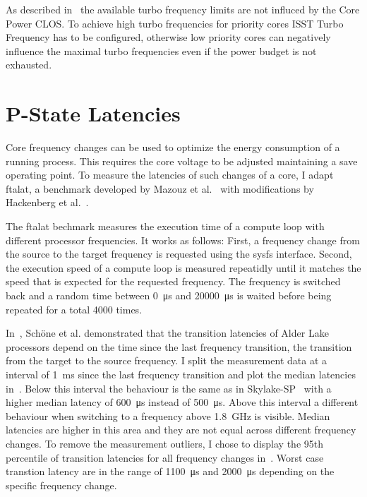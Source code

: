 As described in~ the available turbo frequency limits are not influced by the Core Power CLOS.
To achieve high turbo frequencies for priority cores ISST Turbo Frequency has to be configured, otherwise low priority cores can negatively influence the maximal turbo frequencies even if the power budget is not exhausted.

\section{P-State Latencies}
\label{sec:pstate_latencies}

Core frequency changes can be used to optimize the energy consumption of a running process.
This requires the core voltage to be adjusted maintaining a save operating point.
To measure the latencies of such changes of a core, I adapt ftalat, a benchmark developed by Mazouz et al.~\cite{Mazouz_2014_ftalat} with modifications by Hackenberg et al.~\cite{Hackenberg_2015_Haswell}.

The ftalat bechmark measures the execution time of a compute loop with different processor frequencies.
It works as follows:
First, a frequency change from the source to the target frequency is requested using the sysfs interface.
Second, the execution speed of a compute loop is measured repeatidly until it matches the speed that is expected for the requested frequency.
The frequency is switched back and a random time between \SI{0}{\us} and \SI{20000}{\us} is waited before being repeated for a total \SI{4000}{} times.

In~\cite{Schoene_2024_Alder_Lake}, Schöne et al. demonstrated that the transition latencies of Alder Lake processors depend on the time since the last frequency transition, the transition from the target to the source frequency.
I split the measurement data at a interval of \SI{1}{\ms} since the last frequency transition and plot the median latencies in~.
Below this interval the behaviour is the same as in Skylake-SP~\cite{Schoene_2019_SKL} with a higher median latency of \SI{600}{\us} instead of \SI{500}{\us}.
Above this interval a different behaviour when switching to a frequency above \SI{1.8}{\GHz} is visible.
Median latencies are higher in this area and they are not equal across different frequency changes.
To remove the measurement outliers, I chose to display the 95th percentile of transition latencies for all frequency changes in~.
Worst case transtion latency are in the range of \SI{1100}{\us} and \SI{2000}{\us} depending on the specific frequency change.

